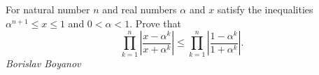 For natural number $n$ and real numbers $\alpha$ and $x$ satisfy the inequalities $\alpha^{n+1}\le x\le1$ and $0<\alpha<1$. Prove that
$$\prod_{k=1}^n\left|\frac{x-\alpha^k}{x+\alpha^k}\right|\le\prod_{k=1}^n\left|\frac{1-\alpha^k}{1+\alpha^k}\right|.$$
\textit{Borislav Boyanov}